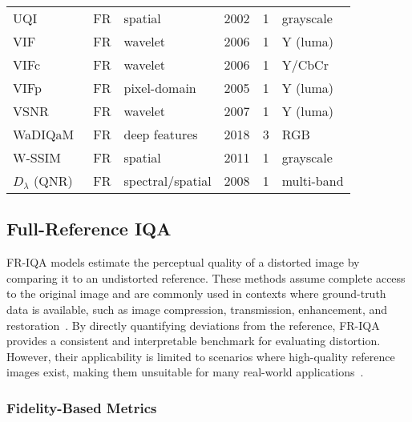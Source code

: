 \begin{longtable}{l l l c c l}
    UQI~\cite{Wang2002UQI}                 & FR   & spatial             & 2002 & 1    & grayscale \\
    VIF~\cite{Sheikh2006VIF}               & FR   & wavelet             & 2006 & 1    & Y (luma) \\
    VIFc~\cite{Sheikh2006VIF}              & FR   & wavelet             & 2006 & 1    & Y/CbCr \\
    VIFp~\cite{Sheikh2005VIFp}             & FR   & pixel-domain        & 2005 & 1    & Y (luma) \\
    VSNR~\cite{chandler2007vsnr}           & FR   & wavelet             & 2007 & 1    & Y (luma) \\
    WaDIQaM~\cite{Bosse2018WaDIQaM}        & FR   & deep features       & 2018 & 3    & RGB \\
    W-SSIM~\cite{Engelke2011WSSIM}         & FR   & spatial             & 2011 & 1    & grayscale \\
    $D_{\lambda}$ (QNR)~\cite{Alparone2008QNR} & FR & spectral/spatial  & 2008 & 1    & multi-band \\
\end{longtable}

\subsection{Full-Reference IQA}\label{sec:full_reference_iqa}

FR-IQA models estimate the perceptual quality of a distorted image by comparing it to an undistorted reference. These methods assume complete access to the original image and are commonly used in contexts where ground-truth data is available, such as image compression, transmission, enhancement, and restoration~\cite{sheikh2006image, wang2004image}. By directly quantifying deviations from the reference, FR-IQA provides a consistent and interpretable benchmark for evaluating distortion. However, their applicability is limited to scenarios where high-quality reference images exist, making them unsuitable for many real-world applications~\cite{mittal2012making, hosu2020koniq}.


\subsubsection{Fidelity-Based Metrics}\label{sec:error_based_metrics}

